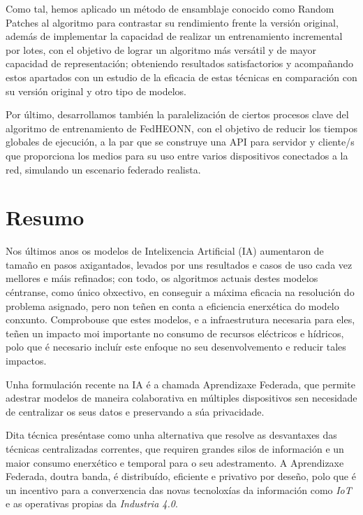 \documentclass[00-Trabajo_Final.tex]{subfiles}
\begin{document}
Como tal, hemos aplicado un método de ensamblaje conocido como Random Patches al algoritmo para contrastar su rendimiento frente la versión original, además de implementar la capacidad de realizar un entrenamiento incremental por lotes, con el objetivo de lograr un algoritmo más versátil y de mayor capacidad de representación; obteniendo resultados satisfactorios y acompañando estos apartados con un estudio de la eficacia de estas técnicas en comparación con su versión original y otro tipo de modelos.

Por último, desarrollamos también la paralelización de ciertos procesos clave del algoritmo de entrenamiento de FedHEONN, con el objetivo de reducir los tiempos globales de ejecución, a la par que se construye una API para servidor y cliente/s que proporciona los medios para su uso entre varios dispositivos conectados a la red, simulando un escenario federado realista.

\newpage
\section{Resumo}

Nos últimos anos os modelos de Intelixencia Artificial (IA) aumentaron de tamaño en pasos axigantados, levados por uns resultados e casos de uso cada vez mellores e máis refinados; con todo, os algoritmos actuais destes modelos céntranse, como único obxectivo, en conseguir a máxima eficacia na resolución do problema asignado, pero non teñen en conta a eficiencia enerxética do modelo conxunto. Comprobouse que estes modelos, e a infraestrutura necesaria para eles, teñen un impacto moi importante no consumo de recursos eléctricos e hídricos, polo que é necesario incluír este enfoque no seu desenvolvemento e reducir tales impactos.

Unha formulación recente na IA é a chamada Aprendizaxe Federada, que permite adestrar modelos de maneira colaborativa en múltiples dispositivos sen necesidade de centralizar os seus datos e preservando a súa privacidade.

Dita técnica preséntase como unha alternativa que resolve as desvantaxes das técnicas centralizadas correntes, que requiren grandes silos de información e un maior consumo enerxético e temporal para o seu adestramento. A Aprendizaxe Federada, doutra banda, é distribuído, eficiente e privativo por deseño, polo que é un incentivo para a converxencia das novas tecnoloxías da información como \textit{IoT} e as operativas propias da \textit{Industria 4.0}.
\end{document}
